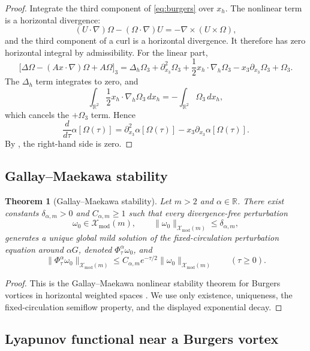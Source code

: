 \documentclass[11pt]{amsart}
\theoremstyle{plain}
\newtheorem{theorem}{Theorem}[section]
\theoremstyle{definition}
\theoremstyle{remark}
\numberwithin{equation}{section}
\begin{document}
\begin{proof}
Integrate the third component of \eqref{eq:burgers} over \(x_h\).  The
nonlinear term is a horizontal divergence:
\[
   (U\cdot\nabla)\Omega-(\Omega\cdot\nabla)U
   =
   -\nabla\times(U\times\Omega),
\]
and the third component of a curl is a horizontal divergence.  It therefore
has zero horizontal integral by admissibility.  For the linear part,
\[
   \bigl[\Delta\Omega-(Ax\cdot\nabla)\Omega+A\Omega\bigr]_3
   =
   \Delta_h\Omega_3+\partial_{x_3}^2\Omega_3
   +\frac12x_h\cdot\nabla_h\Omega_3
   -x_3\partial_{x_3}\Omega_3+\Omega_3 .
\]
The \(\Delta_h\) term integrates to zero, and
\[
   \int_{\mathbb R^2}\frac12x_h\cdot\nabla_h\Omega_3\,dx_h
   =
   -\int_{\mathbb R^2}\Omega_3\,dx_h,
\]
which cancels the \(+\Omega_3\) term.  Hence
\[
   \frac{d}{d\tau}\alpha[\Omega(\tau)]
   =
   \partial_{x_3}^2\alpha[\Omega(\tau)]
   -x_3\partial_{x_3}\alpha[\Omega(\tau)].
\]
By , the right-hand side is zero.
\end{proof}

\subsection{Gallay--Maekawa stability}

\begin{theorem}[Gallay--Maekawa stability]\label{thm:gm}
Let \(m>2\) and \(\alpha\in\mathbb R\).  There exist constants
\(\delta_{\alpha,m}>0\) and \(C_{\alpha,m}\ge1\) such that every
divergence-free perturbation
\[
   \omega_0\in\mathcal X_{\mathrm{mod}}(m),
   \qquad
   \|\omega_0\|_{\mathcal X_{\mathrm{mod}}(m)}
   \le\delta_{\alpha,m},
\]
generates a unique global mild solution of the fixed-circulation perturbation
equation around \(\alpha G\), denoted \(\Phi_\tau^\alpha\omega_0\), and
\[
   \|\Phi_\tau^\alpha\omega_0\|_{\mathcal X_{\mathrm{mod}}(m)}
   \le
   C_{\alpha,m}e^{-\tau/2}
   \|\omega_0\|_{\mathcal X_{\mathrm{mod}}(m)}
   \qquad(\tau\ge0).
\]
\end{theorem}

\begin{proof}
This is the Gallay--Maekawa nonlinear stability theorem for Burgers vortices
in horizontal weighted spaces \cite{GallayMaekawa}.  We use only existence,
uniqueness, the fixed-circulation semiflow property, and the displayed
exponential decay.
\end{proof}

\subsection{Lyapunov functional near a Burgers vortex}
\end{document}
